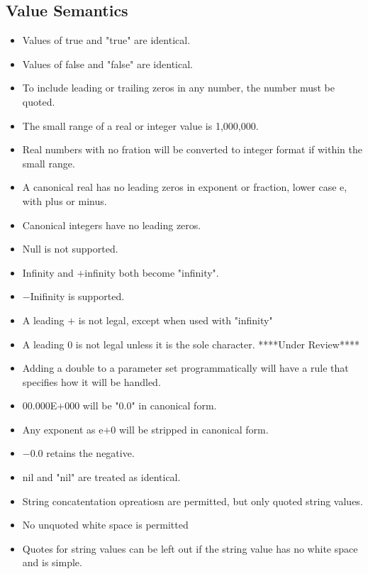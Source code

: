 \documentclass{article}
\begin{document}
        \subsection{Value Semantics}
                \begin{itemize}
                        \item Values of true and "true" are identical.
                        \item Values of false and "false" are identical.
                        \item To include leading or trailing zeros in any number,
                                        the number must be quoted.
                        \item The small range of a real or integer value is 1,000,000.
                        \item Real numbers with no fration will be converted to integer format
                                        if within the small range.
                        \item A canonical real has no leading zeros in exponent or fraction, lower case e, with plus or minus.
                        \item Canonical integers have no leading zeros.
                        \item Null is not supported.
                        \item Infinity and $+$infinity both become "infinity".
                        \item $-$Inifinity is supported.
                        \item A leading $+$ is not legal, except when used with "infinity"
                        \item A leading 0 is not legal unless it is the sole character. ****Under Review****
                        \item Adding a double to a parameter set programmatically will have a rule that specifies how it will be handled.
                        \item 00.000E$+$000 will be "0.0" in canonical form.
                        \item Any exponent as e$+$0 will be stripped in canonical form.
                        \item $-$0.0 retains the negative.
                        \item nil and "nil" are treated as identical.
                        \item String concatentation opreatiosn are permitted, but only quoted string values.
                        \item No unquoted white space is permitted
                        \item Quotes for string values can be left out if the string value has no white space and is simple.
                \end{itemize}
\end{document}
